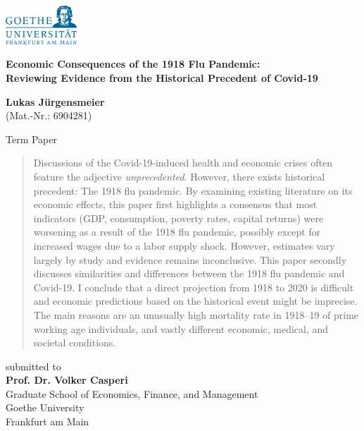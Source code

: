 \documentclass[12pt,a4paper]{article}
\begin{document}

\begin{center}
 \includegraphics[width=0.2\textwidth]{external/GU-Logo-blau-CMYK.eps} \vspace{1.5cm}
  
{\large{\bf Economic Consequences of the 1918 Flu Pandemic:\\
		Reviewing Evidence from the Historical Precedent of Covid-19}}

\textbf{Lukas J\"urgensmeier} \\
{\footnotesize (Mat.-Nr.: 6904281)}

  Term Paper \\\vspace{1.5cm}
  
  \begin{abstract}
  	Discussions of the Covid-19-induced health and economic crises often feature the adjective \textit{unprecedented}.
  	However, there exists historical precedent: The 1918 flu pandemic.
  	By examining existing literature on its economic effects, this paper first highlights a consensus that most indicators (GDP, consumption, poverty rates, capital returns) were worsening as a result of the 1918 flu pandemic, possibly except for increased wages due to a labor supply shock.
  	However, estimates vary largely by study and evidence remains inconclusive.
  	This paper secondly discusses similarities and differences between the 1918 flu pandemic and Covid-19.
  	I conclude that a direct projection from 1918 to 2020 is difficult and economic predictions based on the historical event might be imprecise.
  	The main reasons are an unusually high mortality rate in 1918--19 of prime working age individuals, and vastly different economic, medical, and societal conditions.
  	
  \end{abstract} \vspace{1.5cm}
  
  submitted to \\\vspace{0.5cm}
  \textbf{Prof. Dr. Volker Casperi} \\
  Graduate School of Economics, Finance, and Management \\
  Goethe University \\
  Frankfurt am Main \vspace{1.5cm}
  

\end{center}
\end{document}

